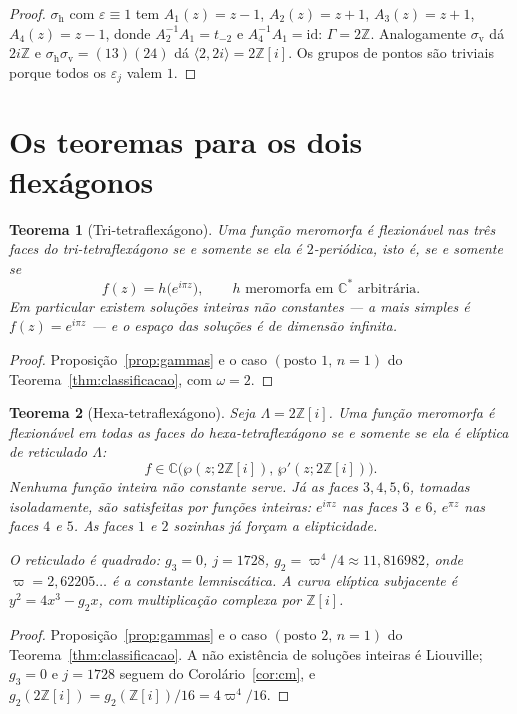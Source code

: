 \documentclass[11pt,a4paper]{article}
\theoremstyle{plain}
\newtheorem{teorema}{Teorema}[section]
\theoremstyle{definition}
\theoremstyle{remark}
\newcommand{\C}{\mathbb{C}}
\newcommand{\Z}{\mathbb{Z}}
\newcommand{\Zi}{\Z[i]}
\begin{document}
\begin{proof}
$\sigma_{\mathrm h}$ com $\varepsilon\equiv1$ tem $A_1(z)=z-1$, $A_2(z)=z+1$,
$A_3(z)=z+1$, $A_4(z)=z-1$, donde $A_2^{-1}A_1=t_{-2}$ e $A_4^{-1}A_1=\mathrm{id}$:
$\Gamma=2\Z$. Analogamente $\sigma_{\mathrm v}$ dá $2i\Z$ e
$\sigma_{\mathrm h}\sigma_{\mathrm v}=(13)(24)$ dá $\langle 2,2i\rangle=2\Zi$.
Os grupos de pontos são triviais porque todos os $\varepsilon_j$ valem $1$.
\end{proof}

\section{Os teoremas para os dois flexágonos}\label{sec:principais}

\begin{teorema}[Tri-tetraflexágono]\label{thm:tri}
Uma função meromorfa é flexionável nas três faces do tri-tetraflexágono se e
somente se ela é $2$-periódica, isto é, se e somente se
\[
\boxed{\;f(z)=h\bigl(e^{i\pi z}\bigr),\qquad h \text{ meromorfa em } \C^\ast
\text{ arbitrária}.\;}
\]
Em particular existem soluções \emph{inteiras} não constantes --- a mais
simples é $f(z)=e^{i\pi z}$ --- e o espaço das soluções é de dimensão infinita.
\end{teorema}

\begin{proof}
Proposição~\ref{prop:gammas} e o caso $(\text{posto }1,\,n=1)$ do
Teorema~\ref{thm:classificacao}, com $\omega=2$.
\end{proof}

\begin{teorema}[Hexa-tetraflexágono]\label{thm:hexa}
Seja $\Lambda=2\Zi$. Uma função meromorfa é flexionável em todas as faces do
hexa-tetraflexágono se e somente se ela é elíptica de reticulado $\Lambda$:
\[
\boxed{\;f\in\C\bigl(\wp(z;2\Zi),\,\wp'(z;2\Zi)\bigr).\;}
\]
\emph{Nenhuma função inteira não constante} serve. Já as faces $3,4,5,6$,
tomadas isoladamente, são satisfeitas por funções inteiras: $e^{i\pi z}$ nas
faces $3$ e $6$, $e^{\pi z}$ nas faces $4$ e $5$. As faces $1$ e $2$ sozinhas
já forçam a elipticidade.

O reticulado é quadrado: $g_3=0$, $j=1728$, $g_2=\varpi^4/4\approx11{,}816982$,
onde $\varpi=2{,}62205\ldots$ é a constante lemniscática. A curva elíptica
subjacente é $y^2=4x^3-g_2x$, com multiplicação complexa por $\Zi$.
\end{teorema}

\begin{proof}
Proposição~\ref{prop:gammas} e o caso $(\text{posto }2,\,n=1)$ do
Teorema~\ref{thm:classificacao}. A não existência de soluções inteiras é
Liouville; $g_3=0$ e $j=1728$ seguem do Corolário~\ref{cor:cm}, e
$g_2(2\Zi)=g_2(\Zi)/16=4\varpi^4/16$.
\end{proof}
\end{document}
